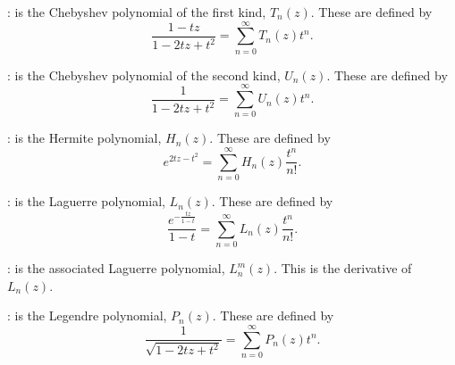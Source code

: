 {{{{{{{{{{{\noindent
{}: \hbox{}\hfill\newline
    is the  Chebyshev polynomial of the first
   kind, $T_n (z)$.  These are defined by
\begin{displaymath}
\frac{1-t z}{1-2 t z+t^2} = \sum_{n=0}^{\infty} T_n (z) t^n.
\end{displaymath}

\noindent
{}: \hbox{}\hfill\newline
    is the  Chebyshev polynomial of the second
   kind, $U_n (z)$. These are defined by
\begin{displaymath}
\frac{1}{1-2 t z+t^2} = \sum_{n=0}^{\infty} U_n (z) t^n.
\end{displaymath}

\noindent
{}:   \hbox{}\hfill\newline
    is the  Hermite polynomial,
   $H_n (z)$.
   These are defined by
\begin{displaymath}
e^{2 t z - t^2} = \sum_{n=0}^{\infty} H_n (z) \frac{t^n}{n!}.
\end{displaymath}

\noindent
{}:  \hbox{}\hfill\newline
    is the  Laguerre polynomial,
   $L_n (z)$.
   These are defined by
\begin{displaymath}
\frac{e^{-\frac{t z}{1-t}}}{1-t} = \sum_{n=0}^{\infty} L_n (z) \frac{t^n}{n!}.
\end{displaymath}

\noindent
{}:  \hbox{}\hfill\newline
    is the associated Laguerre polynomial,
   $L^m_n (z)$.
   This is the  derivative of $L_n (z)$.

\noindent
{}:  \hbox{}\hfill\newline
    is the  Legendre polynomial,
   $P_n (z)$.  These are defined by
\begin{displaymath}
\frac{1}{\sqrt{1-2 t z+t^2}} = \sum_{n=0}^{\infty} P_n (z) t^n.
\end{displaymath}

}}}}}}}}}}}
